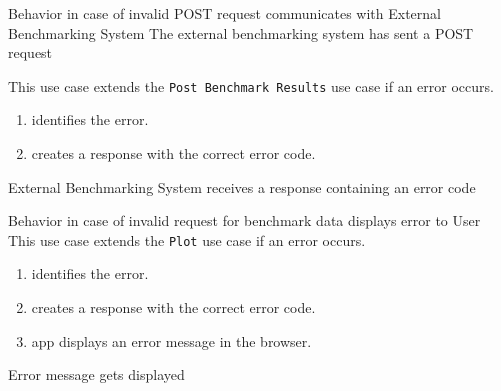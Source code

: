 \bigskip

{Behavior in case of invalid POST request}
{communicates with External Benchmarking System}
{The external benchmarking system has sent a POST request}
{This use case extends the \texttt{Post Benchmark Results} use case if an error occurs.
\begin{enumerate}
    \item \parkview{} identifies the error.
    \item \parkview{} creates a response with the correct error code.
\end{enumerate}}
{External Benchmarking System receives a response containing an error code}

\bigskip

{Behavior in case of invalid request for benchmark data}
{displays error to User}
{This use case extends the \texttt{Plot} use case if an error occurs.}
{\begin{enumerate}
    \item \parkview{} identifies the error.
    \item \parkview{} creates a response with the correct error code.
    \item \parkview{} app displays an error message in the browser.
\end{enumerate}}
{Error message gets displayed}


